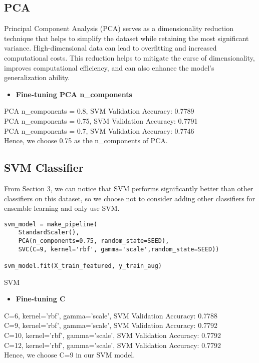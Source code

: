 \documentclass[a4paper,11pt]{article}
\begin{document}
\subsection{PCA}
Principal Component Analysis (PCA) serves as a dimensionality reduction technique that helps to simplify the dataset while retaining the most significant variance. High-dimensional data can lead to overfitting and increased computational costs. This reduction helps to mitigate the curse of dimensionality, improves computational efficiency, and can also enhance the model's generalization ability.
\begin{itemize}
    \item \textbf{Fine-tuning PCA n\_components}
\end{itemize}
PCA n\_components = 0.8, SVM Validation Accuracy: 0.7789 \\
PCA n\_components = 0.75, SVM Validation Accuracy: 0.7791 \\
PCA n\_components = 0.7, SVM Validation Accuracy: 0.7746 \\
Hence, we choose 0.75 as the n\_components of PCA.

\subsection{SVM Classifier}
From Section 3, we can notice that SVM performs significantly better than other classifiers on this dataset, so we choose not to consider adding other classifiers for ensemble learning and only use SVM.

\begin{listing}[!ht]
\begin{verbatim}
svm_model = make_pipeline(
    StandardScaler(), 
    PCA(n_components=0.75, random_state=SEED), 
    SVC(C=9, kernel='rbf', gamma='scale',random_state=SEED))

svm_model.fit(X_train_featured, y_train_aug)
\end{verbatim}
\caption{SVM}
\label{listing:python}
\end{listing}

\begin{itemize}
    \item \textbf{Fine-tuning C}
\end{itemize}
C=6, kernel='rbf', gamma='scale', SVM Validation Accuracy: 0.7788 \\
C=9, kernel='rbf', gamma='scale', SVM Validation Accuracy: 0.7792 \\
C=10, kernel='rbf', gamma='scale', SVM Validation Accuracy: 0.7792 \\
C=12, kernel='rbf', gamma='scale', SVM Validation Accuracy: 0.7792 \\
Hence, we choose C=9 in our SVM model.
\end{document}
